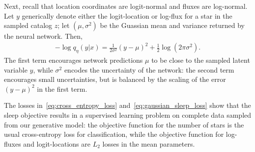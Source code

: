 Next, recall that location coordinates are logit-normal and fluxes are log-normal. 
Let $y$ generically denote either the logit-location or log-flux for a star in the sampled catalog $z$; let $(\mu, \sigma^2)$ be the Guassian mean and variance returned by the neural network. Then,
\begin{align}
    -\log q_\eta(y | x) = 
        \frac{1}{2\sigma^2}(y - \mu)^2
         + \frac{1}{2}\log(2\pi\sigma^2).
         \label{eq:gaussian_sleep_loss}
\end{align}
The first term encourages network predictions $\mu$ to be close to the sampled latent variable $y$, while $\sigma^2$ encodes the uncertainty of the network: the second term encourages small uncertainties, but is 
balanced by the scaling of the error $(y - \mu)^2$ in the first term. 



The losses in~\eqref{eq:cross_entropy_loss} and~\eqref{eq:gaussian_sleep_loss} show that the sleep objective results in a supervised learning problem on complete data sampled from our generative model: the objective function for the number of stars is the usual cross-entropy loss for classification, while the objective function for log-fluxes and logit-locations are $L_2$ losses in the mean parameters. 



